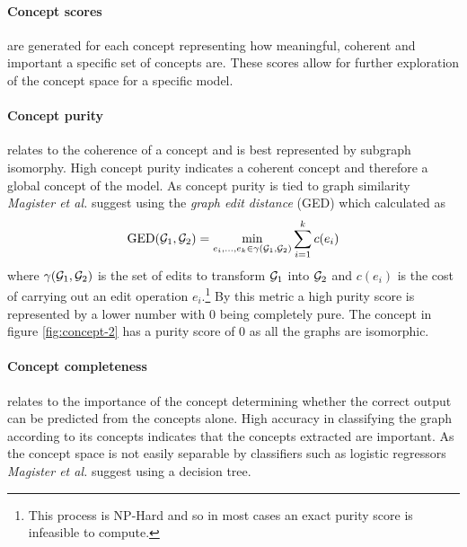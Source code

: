 \paragraph{Concept scores} are generated for each concept representing how meaningful, coherent and important a specific set of concepts are.
These scores allow for further exploration of the concept space for a specific model.

\paragraph{Concept purity}
relates to the coherence of a concept and is best represented by subgraph isomorphy.
High concept purity indicates a coherent concept and therefore a global concept of the model.
As concept purity is tied to graph similarity \textit{Magister et al.}\cite{magister2021gcexplainer} suggest using the \emph{graph edit distance} (GED) which calculated as 
\begin{equation}
    \label{eq:GED}
    \operatorname{GED}({\mathcal{G}}_1, {\mathcal{G}}_2) = \underset{e_i,...,e_k \in \gamma({\mathcal{G}}_1, {\mathcal{G}}_2)}{\operatorname{min}} \sum_{i=1}^{k}c(e_i)
\end{equation}
where $\gamma({\mathcal{G}}_1, {\mathcal{G}}_2)$ is the set of edits to transform ${\mathcal{G}}_1$ into ${\mathcal{G}}_2$ and $c(e_i)$ is the cost of carrying out an edit operation $e_i$.\footnote{This process is NP-Hard and so in most cases an exact purity score is infeasible to compute.}
By this metric a high purity score is represented by a lower number with 0 being completely pure.
The concept in figure \ref{fig:concept-2} has a purity score of 0 as all the graphs are isomorphic.

\paragraph{Concept completeness}
relates to the importance of the concept determining whether the correct output can be predicted from the concepts alone.
High accuracy in classifying the graph according to its concepts indicates that the concepts extracted are important.
As the concept space is not easily separable by classifiers such as logistic regressors \textit{Magister et al.}\cite{magister2021gcexplainer} suggest using a decision tree\cite{kazhdan2020now}.



